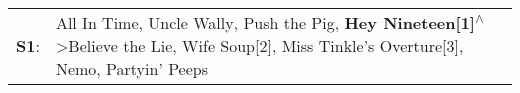 \begin{supertabular}{p{0.03\textwidth}p{0.92\textwidth}}
 \textbf{S1}:  &  All In Time\textsuperscript{}, \enspace Uncle Wally\textsuperscript{}, \enspace Push the Pig\textsuperscript{}, \enspace \textbf{Hey Nineteen[1]\textsuperscript{$\wedge$}} \textgreater \enspace Believe the Lie\textsuperscript{}, \enspace Wife Soup[2]\textsuperscript{}, \enspace Miss Tinkle's Overture[3]\textsuperscript{}, \enspace Nemo\textsuperscript{}, \enspace Partyin' Peeps\textsuperscript{}  \enspace  \\
\end{supertabular}

